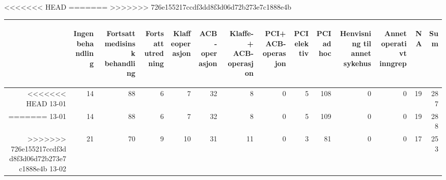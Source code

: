 \documentclass[presentation,xcolor=pdftex,dvipsnames,table]{beamer}
\begin{document}
\begin{frame}
\begin{tiny}
<<<<<<< HEAD
=======
>>>>>>> 726e155217ccdf3dd8f3d06d72b273e7c1888e4b
\begin{table}[ht]
\centering
\begin{tabular}{rrrrrrrrrrrrrr}
  \toprule
 & \begin{sideways} Ingen behandling \end{sideways} & \begin{sideways} Fortsatt medisinsk behandling \end{sideways} & \begin{sideways} Fortsatt utredning \end{sideways} & \begin{sideways} Klaffeoperasjon \end{sideways} & \begin{sideways} ACB-operasjon \end{sideways} & \begin{sideways} Klaffe- + ACB-operasjon \end{sideways} & \begin{sideways} PCI+ACB-operasjon \end{sideways} & \begin{sideways} PCI elektiv \end{sideways} & \begin{sideways} PCI ad hoc \end{sideways} & \begin{sideways} Henvisning til annet sykehus \end{sideways} & \begin{sideways} Annet operativt inngrep \end{sideways} & \begin{sideways} NA \end{sideways} & \begin{sideways} Sum \end{sideways} \\ 
  \midrule
<<<<<<< HEAD
13-01 & 14 & 88 & 6 & 7 & 32 & 8 & 0 & 5 & 108 & 0 & 0 & 19 & 287 \\ 
=======
13-01 & 14 & 88 & 6 & 7 & 32 & 8 & 0 & 5 & 109 & 0 & 0 & 19 & 288 \\ 
>>>>>>> 726e155217ccdf3dd8f3d06d72b273e7c1888e4b
  13-02 & 21 & 70 & 9 & 10 & 31 & 11 & 0 & 3 & 81 & 0 & 0 & 17 & 253 \\ 

\end{tabular}
\end{table}
\end{tiny}
\end{frame}
\end{document}
